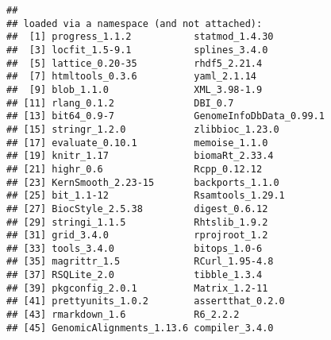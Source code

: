 \documentclass{report}\usepackage[]{graphicx}\usepackage[usenames,dvipsnames]{color}
\newenvironment{knitrout}{}{} %
\begin{document}
\begin{knitrout}
\begin{kframe}
\begin{verbatim}
## 
## loaded via a namespace (and not attached):
##  [1] progress_1.1.2           statmod_1.4.30          
##  [3] locfit_1.5-9.1           splines_3.4.0           
##  [5] lattice_0.20-35          rhdf5_2.21.4            
##  [7] htmltools_0.3.6          yaml_2.1.14             
##  [9] blob_1.1.0               XML_3.98-1.9            
## [11] rlang_0.1.2              DBI_0.7                 
## [13] bit64_0.9-7              GenomeInfoDbData_0.99.1 
## [15] stringr_1.2.0            zlibbioc_1.23.0         
## [17] evaluate_0.10.1          memoise_1.1.0           
## [19] knitr_1.17               biomaRt_2.33.4          
## [21] highr_0.6                Rcpp_0.12.12            
## [23] KernSmooth_2.23-15       backports_1.1.0         
## [25] bit_1.1-12               Rsamtools_1.29.1        
## [27] BiocStyle_2.5.38         digest_0.6.12           
## [29] stringi_1.1.5            Rhtslib_1.9.2           
## [31] grid_3.4.0               rprojroot_1.2           
## [33] tools_3.4.0              bitops_1.0-6            
## [35] magrittr_1.5             RCurl_1.95-4.8          
## [37] RSQLite_2.0              tibble_1.3.4            
## [39] pkgconfig_2.0.1          Matrix_1.2-11           
## [41] prettyunits_1.0.2        assertthat_0.2.0        
## [43] rmarkdown_1.6            R6_2.2.2                
## [45] GenomicAlignments_1.13.6 compiler_3.4.0
\end{verbatim}
\end{kframe}
\end{knitrout}


\end{document}
